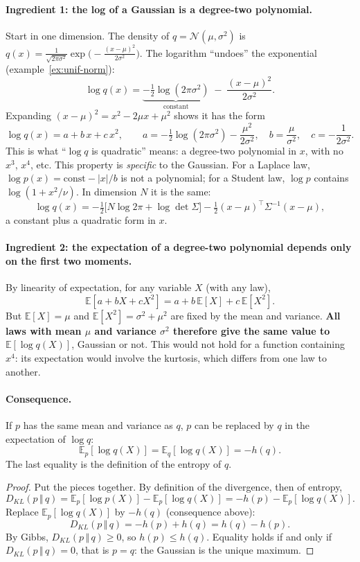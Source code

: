\documentclass[11pt]{article}
\theoremstyle{plain}
\theoremstyle{definition}
\theoremstyle{remark}
\newcommand{\E}{\mathbb{E}}
\newcommand{\N}{\mathcal{N}}
\newcommand{\KL}[2]{D_{KL}\!\left(#1\,\Vert\,#2\right)}
\begin{document}
\paragraph{Ingredient 1: the log of a Gaussian is a degree-two polynomial.}
Start in one dimension. The density of $q=\N(\mu,\sigma^2)$ is
$q(x)=\frac{1}{\sqrt{2\pi\sigma^2}}\exp\!\bigl(-\frac{(x-\mu)^2}{2\sigma^2}\bigr)$.
The logarithm ``undoes'' the exponential (example~\ref{ex:unif-norm}):
\[
\log q(x)=\underbrace{-\tfrac12\log(2\pi\sigma^2)}_{\text{constant}}
\;-\;\frac{(x-\mu)^2}{2\sigma^2}.
\]
Expanding $(x-\mu)^2=x^2-2\mu x+\mu^2$ shows it has the form
\[
\log q(x)=a+b\,x+c\,x^2,
\qquad a=-\tfrac12\log(2\pi\sigma^2)-\frac{\mu^2}{2\sigma^2},\quad
b=\frac{\mu}{\sigma^2},\quad c=-\frac{1}{2\sigma^2}.
\]
This is what ``$\log q$ is quadratic'' means: a degree-two polynomial in $x$,
with no $x^3$, $x^4$, etc. This property is \emph{specific} to the Gaussian.
For a Laplace law, $\log p(x)=\text{const}-|x|/b$ is not a polynomial; for a
Student law, $\log p$ contains $\log(1+x^2/\nu)$. In dimension $N$ it is the
same:
\[
\log q(x)=-\tfrac12\bigl[N\log2\pi+\log\det\Sigma\bigr]
-\tfrac12(x-\mu)^\top\Sigma^{-1}(x-\mu),
\]
a constant plus a quadratic form in $x$.

\paragraph{Ingredient 2: the expectation of a degree-two polynomial depends
only on the first two moments.} By linearity of expectation, for any variable
$X$ (with any law),
\[
\E[a+bX+cX^2]=a+b\,\E[X]+c\,\E[X^2].
\]
But $\E[X]=\mu$ and $\E[X^2]=\sigma^2+\mu^2$ are fixed by the mean and
variance. \textbf{All laws with mean $\mu$ and variance $\sigma^2$ therefore
give the same value to $\E[\log q(X)]$}, Gaussian or not. This would not hold
for a function containing $x^4$: its expectation would involve the kurtosis,
which differs from one law to another.

\paragraph{Consequence.} If $p$ has the same mean and variance as $q$, $p$ can
be replaced by $q$ in the expectation of $\log q$:
\[
\E_p[\log q(X)]=\E_q[\log q(X)]=-h(q).
\]
The last equality is the definition of the entropy of $q$.

\begin{proof}
Put the pieces together. By definition of the divergence, then of entropy,
\[
\KL{p}{q}=\E_p[\log p(X)]-\E_p[\log q(X)]
=-h(p)-\E_p[\log q(X)].
\]
Replace $\E_p[\log q(X)]$ by $-h(q)$ (consequence above):
\[
\KL{p}{q}=-h(p)+h(q)=h(q)-h(p).
\]
By Gibbs, $\KL{p}{q}\ge0$, so $h(p)\le h(q)$. Equality holds if and only if
$\KL{p}{q}=0$, that is $p=q$: the Gaussian is the unique maximum.
\end{proof}
\end{document}
